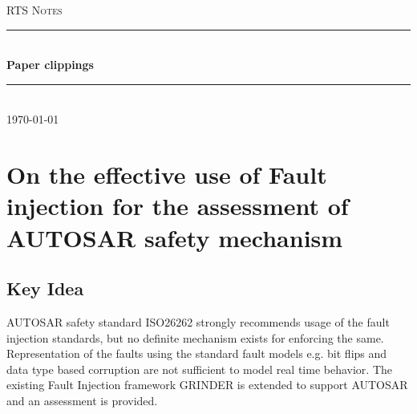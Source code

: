 \documentclass[12pt]{article} %
\begin{document}

\begin{titlepage}

\newcommand{\HRule}{\rule{\linewidth}{0.5mm}} %

\center %

\textsc{\Large RTS Notes}\\[0.5cm] %

\HRule \\[0.4cm]
{ \huge \bfseries Paper clippings}\\[0.4cm] %
\HRule \\[1.5cm]

{\large \today}\\[3cm] %


\vfill %

\end{titlepage}


\tableofcontents %

\newpage %


\section{On the effective use of Fault injection for the assessment of AUTOSAR safety mechanism} %
\subsection{Key Idea} %
AUTOSAR safety standard ISO26262 strongly recommends usage of the fault injection standards, but no definite mechanism exists for enforcing the same.
Representation of the faults using the standard fault models e.g. bit flips and data type based corruption are not sufficient to model real time behavior.
The existing Fault Injection framework GRINDER is extended to support AUTOSAR and an assessment is provided.
\end{document}
